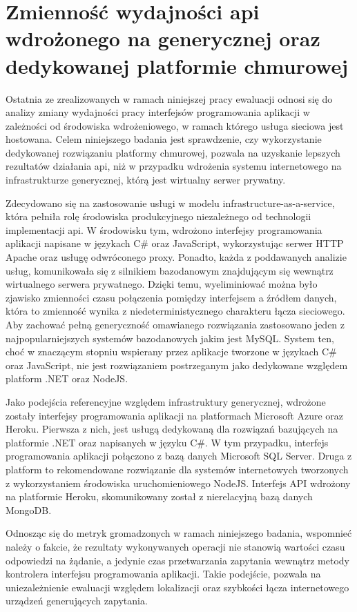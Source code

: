 \section{Zmienność wydajności api wdrożonego na generycznej oraz dedykowanej platformie chmurowej}
Ostatnia ze zrealizowanych w ramach niniejszej pracy ewaluacji odnosi się do analizy zmiany wydajności pracy interfejsów programowania aplikacji w zależności od środowiska wdrożeniowego, w ramach którego usługa sieciowa jest hostowana. Celem niniejszego badania jest sprawdzenie, czy wykorzystanie dedykowanej rozwiązaniu platformy chmurowej, pozwala na uzyskanie lepszych rezultatów działania api, niż w przypadku wdrożenia systemu internetowego na infrastrukturze generycznej, którą jest wirtualny serwer prywatny.

Zdecydowano się na zastosowanie usługi w modelu infrastructure-as-a-service, która pełniła rolę środowiska produkcyjnego niezależnego od technologii implementacji api. W środowisku tym, wdrożono interfejsy programowania aplikacji napisane w językach C\# oraz JavaScript, wykorzystując serwer HTTP Apache oraz usługę odwróconego proxy. Ponadto, każda z poddawanych analizie usług, komunikowała się z silnikiem bazodanowym znajdującym się wewnątrz wirtualnego serwera prywatnego. Dzięki temu, wyeliminiować można było zjawisko zmienności czasu połączenia pomiędzy interfejsem a źródłem danych, która to zmienność wynika z niedeterministycznego charakteru łącza sieciowego. Aby zachować pełną generyczność omawianego rozwiązania zastosowano jeden z najpopularniejszych systemów bazodanowych jakim jest MySQL. System ten, choć w znaczącym stopniu wspierany przez aplikacje tworzone w językach C\# oraz JavaScript, nie jest rozwiązaniem postrzeganym jako dedykowane względem platform .NET oraz NodeJS. 

Jako podejścia referencyjne względem infrastruktury generycznej, wdrożone zostały interfejsy programowania aplikacji na platformach Microsoft Azure oraz Heroku. Pierwsza z nich, jest usługą dedykowaną dla rozwiązań bazujących na platformie .NET oraz napisanych w języku C\#. W tym przypadku, interfejs programowania aplikacji połączono z bazą danych Microsoft SQL Server. Druga z platform to rekomendowane rozwiązanie dla systemów internetowych tworzonych z wykorzystaniem środowiska uruchomieniowego NodeJS. Interfejs API wdrożony na platformie Heroku, skomunikowany został z nierelacyjną bazą danych MongoDB.

Odnosząc się do metryk gromadzonych w ramach niniejszego badania, wspomnieć należy o fakcie, że rezultaty wykonywanych operacji nie stanowią wartości czasu odpowiedzi na żądanie, a jedynie czas przetwarzania zapytania wewnątrz metody kontrolera interfejsu programowania aplikacji. Takie podejście, pozwala na uniezależnienie ewaluacji względem lokalizacji oraz szybkości łącza internetowego urządzeń generujących zapytania.

